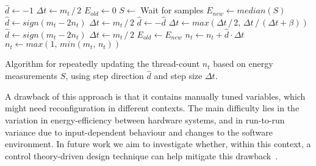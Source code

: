 \begin{algorithm}[!ht]
    \begin{algorithmic}[1]
            \State $\hat{d} \gets -1$
            \State $\Delta t \gets m_t\, /\, 2$
            \State $E_{old} \gets 0$
            \Loop
                \State $S \gets$ Wait for samples
                \State $E_{new} \gets median(S)$
                    \State $\hat{d} \gets sign(m_t - 2 n_t)$
                    \State $\Delta t \gets m_t\, /\, 2$
                \Else
                        \State $\hat{d} \gets -\hat{d}$
                    \EndIf
                        \State $\Delta t \gets max(\Delta t\, /\, 2,\, \Delta t\, /\, (\Delta t + \beta))$
                    \Else
                        \State $\hat{d} \gets sign(m_t - 2 n_t)$
                        \State $\Delta t \gets m_t\, /\, 2$
                    \EndIf
                \EndIf
                \State $E_{old} \gets E_{new}$
                \State $n_t \gets n_t + \hat{d} \cdot \Delta t$
                \State $n_t \gets max(1,\, min(m_t,\, n_t))$
            \EndLoop
    \end{algorithmic}%
    \caption{Algorithm for repeatedly updating the thread-count $n_t$ based on energy measurements $S$, using step direction $\hat{d}$ and step size $\Delta t$.}
    \label{alg:controller}
\end{algorithm}

A drawback of this approach is that it contains manually tuned variables, which might need reconfiguration in different contexts.
The main difficulty lies in the variation in energy-efficiency between hardware systems, and in run-to-run variance due to input-dependent behaviour and changes to the software environment.
In future work we aim to investigate whether, within this context, a control theory-driven design technique can help mitigate this drawback~\cite{control-theory}.
